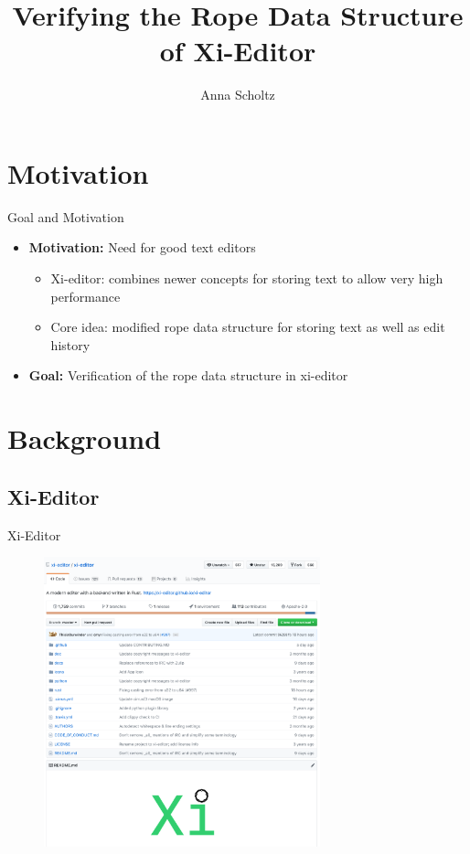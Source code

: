 \documentclass{beamer}
\begin{document}
\title[Verifying the Rope datastructure of Xi-Editor]{Verifying the Rope Data Structure of Xi-Editor}

\author{Anna Scholtz}




\frame[plain]{
    \titlepage
}




\section{Motivation}

\begin{frame}{Goal and Motivation}
  \begin{itemize}
    \item \textbf{Motivation:} Need for good text editors
    \begin{itemize}
      \item Xi-editor: combines newer concepts for storing text to allow very high performance
      \item Core idea: modified rope data structure for storing text as well as edit history
    \end{itemize}
    \item \textbf{Goal:} Verification of the rope data structure in xi-editor  %
  \end{itemize}
\end{frame}


\section{Background}

\subsection{Xi-Editor}

\begin{frame}{Xi-Editor}
    \begin{figure}
        \centering
        \includegraphics[width=8cm]{images/xi-github.png}
    \end{figure}
\end{frame}
\end{document}
